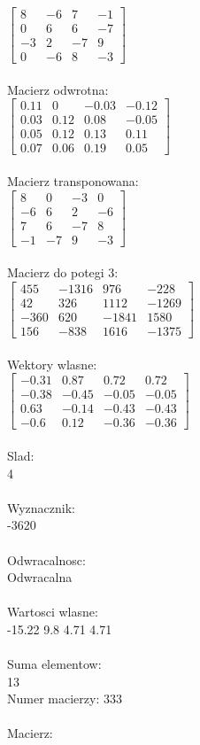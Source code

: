 \documentclass[a4paper,12pt]{article}
\begin{document}
$\begin{bmatrix} 8&-6&7&-1\\0&6&6&-7\\-3&2&-7&9\\0&-6&8&-3 \end{bmatrix}$
\\
\\
Macierz odwrotna:\\

$\begin{bmatrix} 0.11&0&-0.03&-0.12\\0.03&0.12&0.08&-0.05\\0.05&0.12&0.13&0.11\\0.07&0.06&0.19&0.05 \end{bmatrix}$
\\
\\
Macierz transponowana:\\

$\begin{bmatrix} 8&0&-3&0\\-6&6&2&-6\\7&6&-7&8\\-1&-7&9&-3 \end{bmatrix}$
\\
\\
Macierz do potegi 3:\\

$\begin{bmatrix} 455&-1316&976&-228\\42&326&1112&-1269\\-360&620&-1841&1580\\156&-838&1616&-1375 \end{bmatrix}$
\\
\\
Wektory wlasne:\\

$\begin{bmatrix} -0.31&0.87&0.72&0.72\\-0.38&-0.45&-0.05&-0.05\\0.63&-0.14&-0.43&-0.43\\-0.6&0.12&-0.36&-0.36 \end{bmatrix}$
\\
\\
Slad:\\
4
\\
\\
Wyznacznik:\\
-3620
\\
\\
Odwracalnosc:\\
Odwracalna
\\
\\
Wartosci wlasne:\\
-15.22 9.8 4.71 4.71
\\
\\
Suma elementow:\\
13
\\
\newpage
Numer macierzy:
333
\\
\\
Macierz:\\
\end{document}
